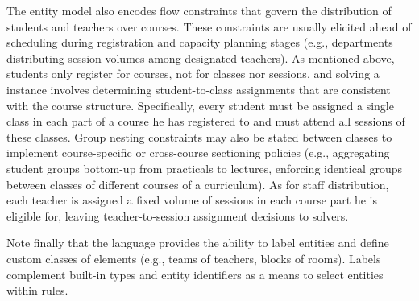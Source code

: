 The entity model also encodes flow constraints that govern the distribution of students and teachers over courses. 
These constraints %
are usually elicited ahead of scheduling during registration and capacity planning stages (e.g., departments distributing session volumes among designated teachers). 
As mentioned above, students only register for courses, not for classes nor sessions, and solving a {\UTP} instance involves determining student-to-class assignments that are consistent with the course structure.
Specifically, every student must be assigned a single class in each part of a course he has registered to and must attend all sessions of these classes. 
Group nesting constraints may also be stated between classes %
to implement course-specific or cross-course sectioning policies (e.g., aggregating student groups bottom-up from practicals to lectures, enforcing identical groups between classes of different courses of a curriculum).
As for staff distribution, each teacher is assigned a fixed volume of sessions in each course part he is eligible for, leaving teacher-to-session assignment decisions to solvers.

Note finally that the language provides the ability to label entities and define custom classes of elements (e.g., teams of teachers, blocks of rooms). %
Labels complement built-in types and entity identifiers as a means to select entities within rules.
  






